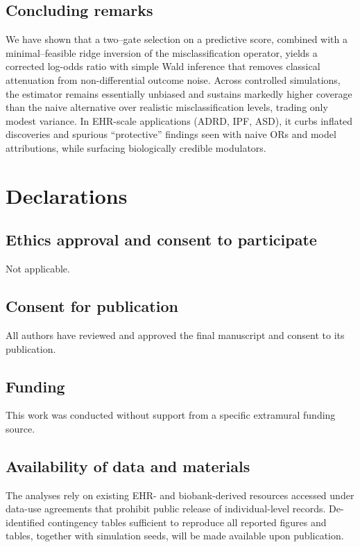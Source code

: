 \documentclass[pdflatex,sn-mathphys-num]{sn-jnl}%
\theoremstyle{thmstyleone}%
\theoremstyle{thmstyletwo}%
\theoremstyle{thmstylethree}%
\begin{document}
\subsection*{Concluding remarks}
We have shown that a two–gate selection on a predictive score, combined with a minimal–feasible ridge inversion of the misclassification operator, yields a corrected log-odds ratio with simple Wald inference that removes classical attenuation from non-differential outcome noise. Across controlled simulations, the estimator remains essentially unbiased and sustains markedly higher coverage than the naive alternative over realistic misclassification levels, trading only modest variance. In EHR-scale applications (ADRD, IPF, ASD), it curbs inflated discoveries and spurious “protective” findings seen with naive ORs and model attributions, while surfacing biologically credible modulators. 


\section{Declarations}

\subsection*{Ethics approval and consent to participate}
Not applicable.

\subsection{Consent for publication}
All authors have reviewed and approved the final manuscript and consent to its publication.

\subsection*{Funding}
This work was conducted without support from a specific extramural funding source.

\subsection*{Availability of data and materials}
The analyses rely on existing EHR- and biobank-derived resources accessed under data-use agreements that prohibit public release of individual-level records. De-identified contingency tables sufficient to reproduce all reported figures and tables, together with simulation seeds, will be made available upon publication.
\end{document}
